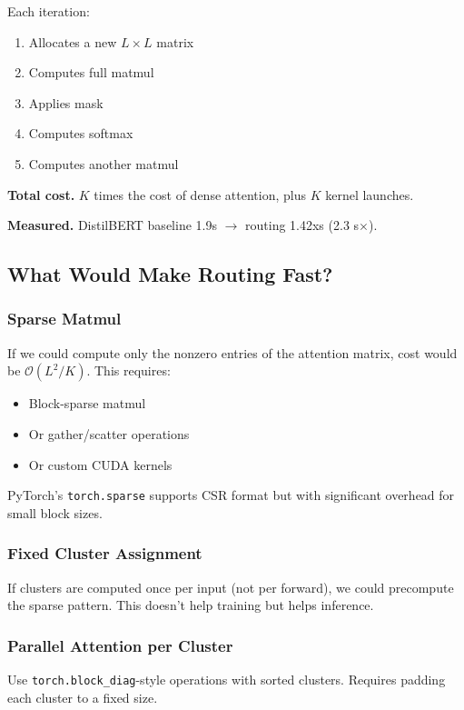 Each iteration:
\begin{enumerate}
\item Allocates a new $L \times L$ matrix
\item Computes full matmul
\item Applies mask
\item Computes softmax
\item Computes another matmul

\end{enumerate}
\textbf{Total cost.} $K$ times the cost of dense attention, plus $K$ kernel launches.

\textbf{Measured.} DistilBERT baseline 1.9s $\to$ routing 1.42xs (2.3 s$\times$).

\subsection{What Would Make Routing Fast?}

\subsubsection{Sparse Matmul}

If we could compute only the nonzero entries of the attention matrix, cost 
would be $\mathcal{O}(L^2/K)$. This requires:

\begin{itemize}
\item Block-sparse matmul
\item Or gather/scatter operations
\item Or custom CUDA kernels

\end{itemize}
PyTorch's \texttt{torch.sparse} supports CSR format but with significant overhead 
for small block sizes.

\subsubsection{Fixed Cluster Assignment}

If clusters are computed once per input (not per forward), we could 
precompute the sparse pattern. This doesn't help training but helps inference.

\subsubsection{Parallel Attention per Cluster}

Use \texttt{torch.block\_diag}-style operations with sorted clusters. Requires 
padding each cluster to a fixed size.


